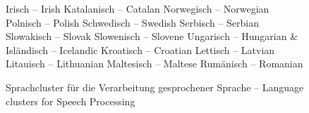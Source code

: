\documentclass[]{../../metanetpaper}
\begin{document}
\begin{Parallel}[c]{79mm}{78mm}
\begin{figure}
\begin{tabular}
Irisch -- Irish \newline  
Katalanisch -- Catalan \newline 
Norwegisch -- Norwegian \newline 
Polnisch -- Polish \newline 
Schwedisch -- Swedish \newline
Serbisch -- Serbian \newline 
Slowakisch -- Slovak \newline 
Slowenisch -- Slovene \newline 
Ungarisch -- Hungarian  
& Isländisch -- Icelandic \newline  
Kroatisch -- Croatian \newline 
Lettisch -- Latvian \newline 
Litauisch -- Lithuanian \newline 
Maltesisch -- Maltese \newline 
Rumänisch -- Romanian\\
\end{tabular}
\label{fig:speech_cluster}
\caption{Sprachcluster für die Verarbeitung gesprochener Sprache -- Language clusters for Speech Processing}
\end{figure}


\end{Parallel}
\end{document}

